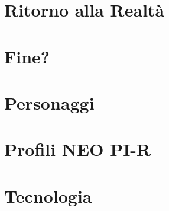 \documentclass[a4paper,9pt]{book}
\begin{document}
\chapter{Ritorno alla Realtà}


\chapter{Fine?}




\chapter*{Personaggi}

\chapter*{Profili NEO PI-R}

\chapter*{Tecnologia}


%
%
%
%
%
%
%
%
%
%
\end{document}

